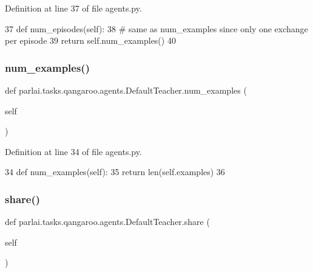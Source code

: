 Definition at line 37 of file agents.\+py.


\begin{DoxyCode}
37     \textcolor{keyword}{def }num\_episodes(self):
38         \textcolor{comment}{# same as num\_examples since only one exchange per episode}
39         \textcolor{keywordflow}{return} self.num\_examples()
40 
\end{DoxyCode}
\mbox{\label{classparlai_1_1tasks_1_1qangaroo_1_1agents_1_1DefaultTeacher_a88e8755506c654d988f3071823941b91}} 
\subsubsection{\texorpdfstring{num\+\_\+examples()}{num\_examples()}}
{\footnotesize\ttfamily def parlai.\+tasks.\+qangaroo.\+agents.\+Default\+Teacher.\+num\+\_\+examples (\begin{DoxyParamCaption}\item[{}]{self }\end{DoxyParamCaption})}



Definition at line 34 of file agents.\+py.


\begin{DoxyCode}
34     \textcolor{keyword}{def }num\_examples(self):
35         \textcolor{keywordflow}{return} len(self.examples)
36 
\end{DoxyCode}
\mbox{\label{classparlai_1_1tasks_1_1qangaroo_1_1agents_1_1DefaultTeacher_a9563de73ddadc0d567516f5b1615a264}} 
\subsubsection{\texorpdfstring{share()}{share()}}
{\footnotesize\ttfamily def parlai.\+tasks.\+qangaroo.\+agents.\+Default\+Teacher.\+share (\begin{DoxyParamCaption}\item[{}]{self }\end{DoxyParamCaption})}



